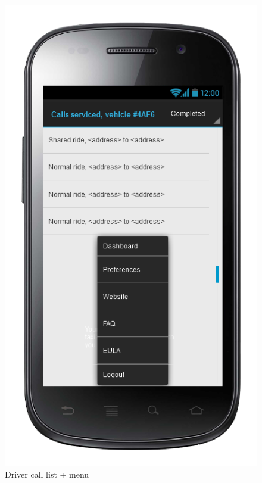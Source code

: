 \begin{center}
\begin{figure} [h]
  	  \includegraphics[scale=0.5]{ui/Driver call list + menu.png}
\caption{Driver call list + menu}
    
	\end{figure}
\end{center}

